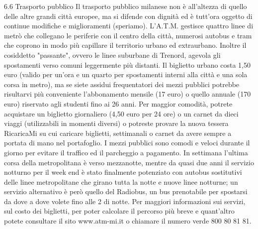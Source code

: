 6.6 Trasporto pubblico
Il trasporto pubblico milanese non è all'altezza di quello delle altre grandi città europee, ma si difende con dignità ed è tutt'ora oggetto di continue modifiche e miglioramenti (speriamo). L'A.T.M. gestisce quattro linee di metrò che collegano le periferie con il centro della città, numerosi autobus e tram che coprono in modo più capillare il territorio urbano ed extraurbano. Inoltre il cosiddetto "passante", ovvero le linee suburbane di Trenord, agevola gli spostamenti verso comuni leggermente più distanti. 
Il biglietto urbano costa 1,50 euro (valido per un'ora e un quarto per spostamenti interni alla città e una sola corsa in metro), ma se siete assidui frequentatori dei mezzi pubblici potrebbe risultarvi più conveniente l'abbonamento mensile (17 euro) o quello annuale (170 euro) riservato agli studenti fino ai 26 anni. Per maggior comodità, potrete acquistare un biglietto giornaliero (4,50 euro per 24 ore) o un carnet da dieci viaggi (utilizzabili in momenti diversi) o potreste provare la nuova tessera RicaricaMi su cui caricare biglietti, settimanali o carnet da avere sempre a portata di mano nel portafoglio.
I mezzi pubblici sono comodi e veloci durante il giorno per evitare il traffico ed il parcheggio a pagamento. In settimana l'ultima corsa della metropolitana è verso mezzanotte, mentre da quasi due anni il servizio notturno per il week end è stato finalmente potenziato con autobus sostitutivi delle linee metropolitane che girano tutta la notte e nuove linee notturne; un servizio alternativo è però quello del Radiobus, un bus prenotabile per spostarsi da dove a dove volete fino alle 2 di notte.
Per maggiori informazioni sui servizi, sul costo dei biglietti, per poter calcolare il percorso più breve e quant'altro potete consultare il sito www.atm-mi.it o chiamare il numero verde 800 80 81 81. 
